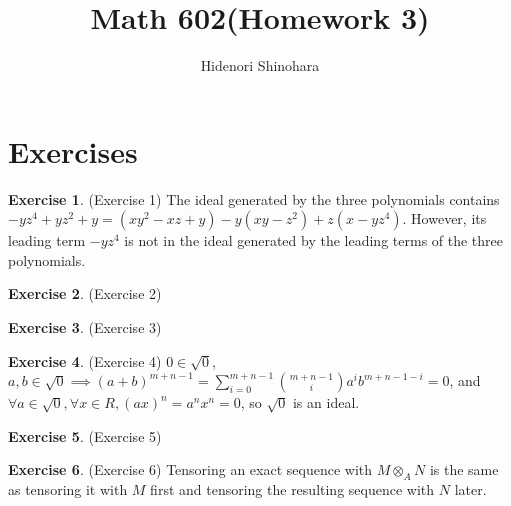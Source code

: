 \documentclass[12pt, psamsfonts]{amsart}
\theoremstyle{definition}
\newtheorem*{exer}{Exercise}
\theoremstyle{remark}
\numberwithin{equation}{section}
\begin{document}
\title{Math 602(Homework 3)}
\author{Hidenori Shinohara}
\maketitle

\section{Exercises}

\begin{exer}{(Exercise 1)}
  The ideal generated by the three polynomials contains $-yz^4 + yz^2 + y = (xy^2 - xz + y) - y(xy - z^2) + z(x - yz^4)$.
  However, its leading term $-yz^4$ is not in the ideal generated by the leading terms of the three polynomials. 
\end{exer}

\begin{exer}{(Exercise 2)}
\end{exer}

\begin{exer}{(Exercise 3)}
\end{exer}

\begin{exer}{(Exercise 4)}
  $0 \in \sqrt{0}$, $a, b \in \sqrt{0} \implies (a + b)^{m + n - 1} = \sum_{i=0}^{m + n - 1} \binom{m + n - 1}{i} a^ib^{m + n - 1 - i} = 0$, and $\forall a \in \sqrt{0}, \forall x \in R, (ax)^n = a^nx^n = 0$, so $\sqrt{0}$ is an ideal.
\end{exer}

\begin{exer}{(Exercise 5)}
\end{exer}

\begin{exer}{(Exercise 6)}
  Tensoring an exact sequence with $M \otimes_A N$ is the same as tensoring it with $M$ first and tensoring the resulting sequence with $N$ later.
\end{exer}
\end{document}

